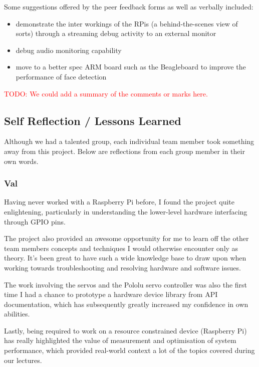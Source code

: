 \documentclass[11pt,a4paper,titlepage]{report}
\begin{document}
Some suggestions offered by the peer feedback forms as well as verbally included:

\begin{itemize}
    \item demonstrate the inter workings of the RPis (a behind-the-scenes view of sorts) through a streaming debug activity to an external monitor
    \item debug audio monitoring capability
    \item move to a better spec ARM board such as the Beagleboard to improve the performance of face detection
\end{itemize}

\textcolor{red}{TODO: We could add a summary of the comments or marks here.}


\subsection{Self Reflection / Lessons Learned}

Although we had a talented group, each individual team member took something away from this project. Below are reflections from each group member in their own words.

\subsubsection{Val}

Having never worked with a Raspberry Pi before, I found the project quite enlightening, particularly in understanding the lower-level hardware interfacing through GPIO pins. 

The project also provided an awesome opportunity for me to learn off the other team members concepts and techniques I would otherwise encounter only as theory. It's been great to have such a wide knowledge base to draw upon when working towards troubleshooting and resolving hardware and software issues.

The work involving the servos and the Pololu servo controller was also the first time I had a chance to prototype a hardware device library from API documentation, which has subsequently greatly increased my confidence in own abilities.

Lastly, being required to work on a resource constrained device (Raspberry Pi) has really highlighted the value of measurement and optimisation of system performance, which provided real-world context a lot of the topics covered during our lectures.
\end{document}
